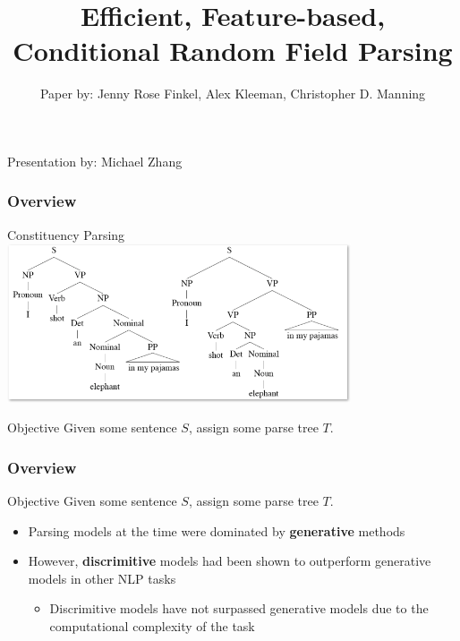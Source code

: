 \documentclass{beamer}
\title{Efficient, Feature-based, Conditional Random Field Parsing}
\author{Paper by: Jenny Rose Finkel, Alex Kleeman, Christopher D. Manning}
\institute{Published at ACL, 2008}
\date{}
\begin{document}
\begin{frame}
  \titlepage
  Presentation by: Michael Zhang
\end{frame}



\begin{frame}
  \frametitle{Overview}

  \begin{block}{Constituency Parsing}
    \includegraphics[width=4in]{example_parse.png}
  \end{block}

  \begin{block}{Objective}
    Given some sentence $S$, assign some parse tree $T$.
  \end{block}

\end{frame}


\begin{frame}
  \frametitle{Overview}

  \begin{block}{Objective}
    Given some sentence $S$, assign some parse tree $T$.
  \end{block}

  \begin{itemize}
    \item Parsing models at the time were dominated by \textbf{generative} methods
    \item However, \textbf{discrimitive} models had been shown to outperform generative models
          in other NLP tasks
    \begin{itemize}
      \item Discrimitive models have not surpassed generative models due to the computational
            complexity of the task
    \end{itemize}
  \end{itemize}

\end{frame}
\end{document}
